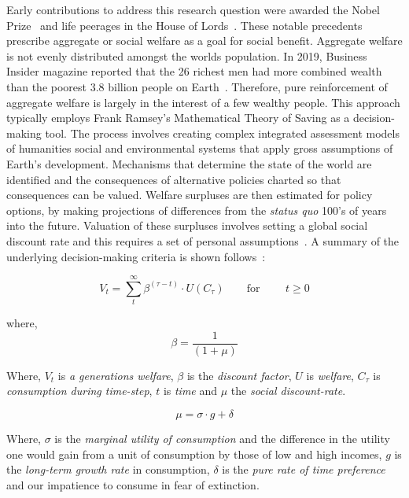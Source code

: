 \documentclass[11pt, oneside]{book}   	%
\begin{document}
Early contributions to address this research question were awarded the Nobel Prize~\cite{np1} and life peerages in the House of Lords~\cite{g1}. These notable precedents prescribe aggregate or social welfare as a goal for social benefit. Aggregate welfare is not evenly distributed amongst the worlds population. In 2019, Business Insider magazine reported that the 26 richest men had more combined wealth than the poorest 3.8 billion people on Earth~\cite{bi1}. Therefore, pure reinforcement of aggregate welfare is largely in the interest of a few wealthy people. This approach typically employs Frank Ramsey's Mathematical Theory of Saving as a decision-making tool. The process involves creating complex integrated assessment models of humanities social and environmental systems that apply gross assumptions of Earth's development. Mechanisms that determine the state of the world are identified and the consequences of alternative policies charted so that consequences can be valued. Welfare surpluses are then estimated for policy options, by making projections of differences from the \emph{status quo} 100's of years into the future. Valuation of these surpluses involves setting a global social discount rate and this requires a set of personal assumptions~\cite{pd2}. A summary of the underlying decision-making criteria is shown follows~\cite{fr1}:

\begin{equation}
V_t = \sum_t^\infty \beta^{(\tau - t)} \cdot U (C_\tau)
\qquad \text{for }
\qquad t \geq 0
\end{equation}

where,
\begin{equation}
\beta = \frac{1}{(1+\mu)}
\end{equation}

Where, $V_t$ is \emph{a generations welfare}, $\beta$ is the \emph{discount factor}, $U$ is \emph{welfare}, $C_\tau$ is \emph{consumption during time-step}, $t$ is \emph{time} and $\mu$ the \emph{social discount-rate}.

\begin{equation}
\mu = \sigma \cdot g + \delta
\end{equation}

Where, $\sigma$ is the \emph{marginal utility of consumption} and the difference in the utility one would gain from a unit of consumption by those of low and high incomes, $g$ is the \emph{long-term growth rate} in consumption, $\delta$ is the \emph{pure rate of time preference} and our impatience to consume in fear of extinction.
\end{document}
